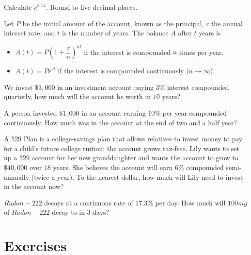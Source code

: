\begin{example}
  Calculate $e^{3.14}$. Round to five decimal places.
\end{example}

\vspace*{-0.3\textheight}

\begin{note}
Let $P$ be the initial amount of the account, known as the principal, $r$ the annual interest rate, and $t$ is the number of years. The balance $A$ after $t$ years is

\begin{itemize}
  \item $A(t)=P{\left (1+\dfrac{r}{n} \right )}^{nt}$ if the interest is compounded $n$ times per year.
  \item $A(t)=Pe^{rt}$ if the interest is compounded continuously ($n\to \infty$).
\end{itemize}
\end{note}
\begin{example}
  We invest $\$3,000$ in an investment account paying $3\%$ interest compounded quarterly, how much will the account be worth in $10$ years?
\end{example}



\begin{example}
  A person invested $\$1,000$ in an account earning $10\%$ per year compounded continuously. How much was in the account at the end of two and a half year?
\end{example}

\newpage

\begin{example}
  A 529 Plan is a college-savings plan that allows relatives to invest money to pay for a child's future college tuition; the account grows tax-free. Lily wants to set up a 529 account for her new granddaughter and wants the account to grow to $\$40,000$ over $18$ years. She believes the account will earn $6\%$ compounded semi-annually (twice a year). To the nearest dollar, how much will Lily need to invest in the account now?
\end{example}

\begin{example}
  $Radon-222$ decays at a continuous rate of $17.3\%$ per day. How much will $100 mg$ of $Radon-222$ decay to in $3$ days?
\end{example}

\newpage
\section*{Exercises}

